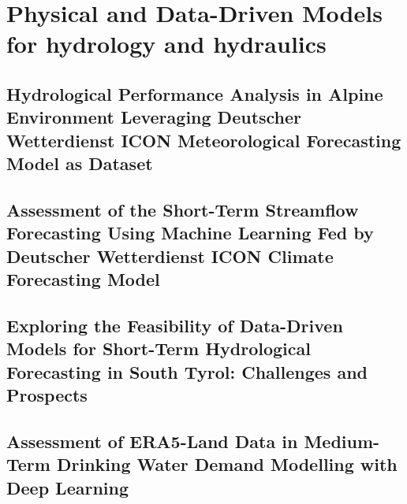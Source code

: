 \chapter{Physical and Data-Driven Models for hydrology and hydraulics}

\ifpdf
    \graphicspath{{Chapter5/Figs/Raster/}{Chapter5/Figs/PDF/}{Chapter5/Figs/}}
\else
    \graphicspath{{Chapter5/Figs/Vector/}{Chapter5/Figs/}}
\fi

\section{Hydrological Performance Analysis in Alpine Environment Leveraging Deutscher Wetterdienst ICON Meteorological Forecasting Model as Dataset} %


\section{Assessment of the Short-Term Streamflow Forecasting Using Machine Learning Fed by Deutscher Wetterdienst ICON Climate Forecasting Model} %


\section{Exploring the Feasibility of Data-Driven Models for Short-Term Hydrological Forecasting in South Tyrol: Challenges and Prospects} %

\section{Assessment of ERA5-Land Data in Medium-Term Drinking Water Demand Modelling with Deep Learning} %